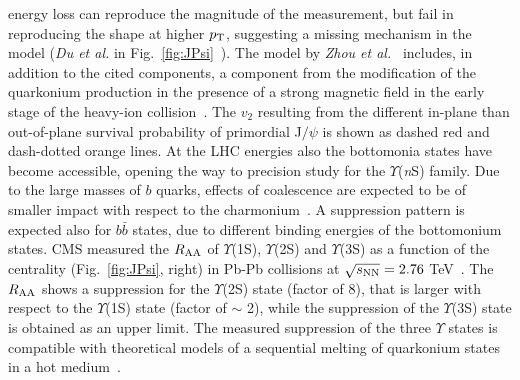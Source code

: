 energy loss can reproduce the magnitude of the measurement, but fail in reproducing the shape at higher $p_{\rm T}$, suggesting a missing mechanism in the model ({\it Du et al.} in Fig.~\ref{fig:JPsi}~\cite{Du:2015wha}). The model by {\it Zhou et al.}~\cite{Zhou:2014kka} includes, in addition to the cited components, a component from the modification of the quarkonium production in the presence of a strong magnetic field in the early stage of the heavy-ion collision~\cite{Guo:2015nsa}. The $v_2$ resulting from the different in-plane than out-of-plane survival probability of primordial J$/\psi$ is shown as dashed red and dash-dotted orange lines. At the LHC energies also the bottomonia states have become accessible, opening the way to precision study for the $\Upsilon$({\it n}S) family. Due to the large masses of $b$ quarks, effects of coalescence are expected to be of smaller impact with respect to the charmonium~\cite{Andronic:2015wma}. A suppression pattern is expected also for $b\bar{b}$ states, due to different binding energies of the bottomonium states. CMS measured the $R_{\rm AA}$ of $\Upsilon$(1S), $\Upsilon$(2S) and $\Upsilon$(3S) as a function of the centrality (Fig.~\ref{fig:JPsi}, right) in Pb-Pb collisions at $\sqrt{s_{\rm NN}} = 2.76$ TeV~\cite{Khachatryan:2016xxp}. The $R_{\rm AA}$ shows a suppression for the $\Upsilon$(2S) state (factor of 8), that is larger with respect to the $\Upsilon$(1S) state (factor of $\sim$ 2), while the suppression of the $\Upsilon$(3S) state is obtained as an upper limit. The measured suppression of the three $\Upsilon$ states is compatible with theoretical models of a sequential melting of quarkonium states in a hot medium~\cite{Khachatryan:2016xxp}.
